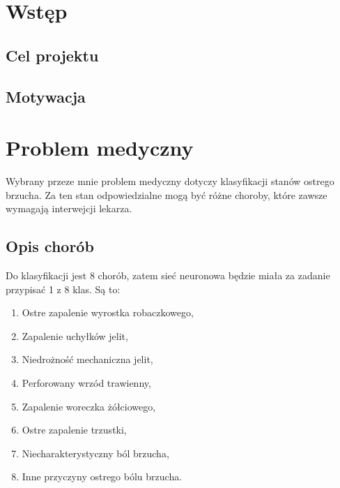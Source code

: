 \documentclass{report}
\begin{document}
    \tableofcontents

    \chapter{Wstęp}\label{ch:wstęp}

    \section{Cel projektu}\label{sec:celProjektu}

    \section{Motywacja}\label{sec:motywacja}

    \chapter{Problem medyczny}\label{ch:problemMedyczny}

    Wybrany przeze mnie problem medyczny dotyczy klasyfikacji stanów ostrego brzucha.
    Za ten stan odpowiedzialne mogą być różne choroby, które zawsze wymagają interwejcji lekarza.

    \section{Opis chorób}\label{sec:opisChorób}

    Do klasyfikacji jest 8 chorób, zatem sieć neuronowa będzie miała za zadanie przypisać 1 z 8 klas.
    Są to:
    \begin{enumerate}
        \item Ostre zapalenie wyrostka robaczkowego,
        \item Zapalenie uchyłków jelit,
        \item Niedrożność mechaniczna jelit,
        \item Perforowany wrzód trawienny,
        \item Zapalenie woreczka żółciowego,
        \item Ostre zapalenie trzustki,
        \item Niecharakterystyczny ból brzucha,
        \item Inne przyczyny ostrego bólu brzucha.
    \end{enumerate}
\end{document}
